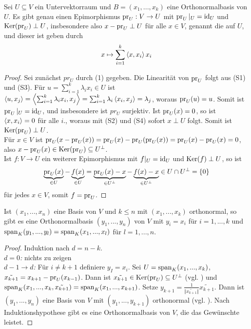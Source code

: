 \begin{proposition}
	Sei $U\subseteq V$ ein Untervektorraum und $B=(x_1,...,x_k)$ eine Orthonormalbasis von $U$. Es gibt genau einen Epimorphismus $\operatorname{pr}_U:V\to U$ mit $\operatorname{pr}_U\vert_U=\operatorname{id}_U$ und $\operatorname{Ker}(\operatorname{pr}_U)\perp U$, insbesondere also $x-\operatorname{pr}_U\perp U$ für alle $x\in V$, genannt die  auf $U$, und dieser ist geben durch
	\begin{align}
		x\mapsto\sum_{i=1}^k \left\langle x,x_i\right\rangle x_i
	\end{align}
\end{proposition}
\begin{proof}
	Sei zunächst $pr_U$ durch (1) gegeben. Die Linearität von $\operatorname{pr}_U$ folgt aus (S1) und (S3). Für $u=\sum_{i=1}^k \lambda_i x_i\in U$ ist $\left\langle u,x_j\right\rangle=\left\langle \sum_{i=1}^k \lambda_i x_i,x_j\right\rangle=\sum_{i=1}^k \lambda_i\left\langle x_i,x_j\right\rangle=\lambda_j$, woraus $\operatorname{pr}_U(u)=u$. Somit ist $\operatorname{pr}_U\vert_U=\operatorname{id}_U$, und insbesondere ist $pr_U$ surjektiv. Ist $\operatorname{pr}_U(x)=0$, so ist $\left\langle x,x_i\right\rangle=0$ für alle $i$., woraus mit (S2) und (S4) sofort $x\perp U$ folgt. Somit ist $\operatorname{Ker}(\operatorname{pr}_U)\perp U$. \\
	Für $x\in V$ ist $\operatorname{pr}_U(x-\operatorname{pr}_U(x))=\operatorname{pr}_U(x)-\operatorname{pr}_U(\operatorname{pr}_U(x))=\operatorname{pr}_U(x)-\operatorname{pr}_U(x)=0$, also $x-\operatorname{pr}_U(x)\in\operatorname{Ker}(\operatorname{pr}_U)\subseteq U^\perp$. \\
	Ist $f:V\to U$ ein weiterer Epimorphismus mit $f\vert_U=\operatorname{id}_U$ und $\operatorname{Ker}(f)\perp U$, so ist 
	\begin{align}
		\underbrace{\operatorname{pr}_U(x)}_{\in U}-\underbrace{f(x)}_{\in U}=\underbrace{\operatorname{pr}_U(x)-x}_{\in U^\perp}-\underbrace{f(x)-x}_{\in U^\perp}\in U\cap U^\perp =\{0\}\notag
	\end{align}
	für jedes $x\in V$, somit $f=\operatorname{pr}_U$.
\end{proof}

\begin{theorem}
	Ist $(x_1,...,x_n)$ eine Basis von $V$ und $k\le n$ mit $(x_1,...,x_k)$ orthonormal, so gibt es eine Orthonormalbasis $(y_1,...,y_n)$ von $V$ mit $y_i=x_i$ für $i=1,...,k$ und $\operatorname{span}_K(y_1,...,y_l)=\operatorname{span}_K(x_1,...,x_l)$ für $l=1,...,n$.
\end{theorem}
\begin{proof}
	Induktion nach $d=n-k$. \\
	\emph{$d=0$:} nichts zu zeigen \\
	\emph{$d-1\to d$:} Für $i\neq k+1$ definiere $y_I=x_i$. Sei $U=\operatorname{span}_K(x_1,...,x_k)$, $\tilde{x_{k+1}}=x_{k+1}-\operatorname{pr}_U(x_{k-1})$. Dann ist $\tilde{x_{k+1}}\in\operatorname{Ker}(\operatorname{pr}_U)\subseteq U^\perp$ (vgl. ) und $\operatorname{span}_K(x_1,...,x_k,\tilde{x_{k+1}})=\operatorname{span}_K(x_1,...,x_{k+1})$. Setze $y_{k+1}=\frac{1}{\Vert \tilde{x_{k+1}}\Vert}\tilde{x_{k+1}}$. Dann ist $(y_1,...,y_n)$ eine Basis von $V$ mit $(y_1,...,y_{k+1})$ orthonormal (vgl. ). Nach Induktionshypothese gibt es eine Orthonormalbasis von $V$, die das Gewünschte leistet.
\end{proof}

